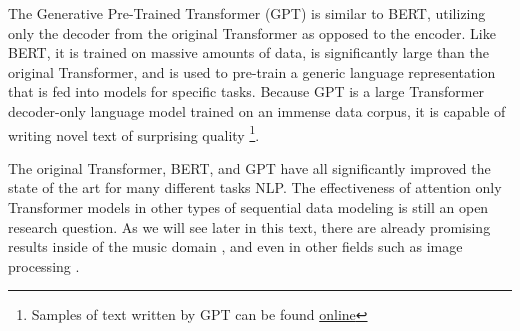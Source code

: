 The Generative Pre-Trained Transformer (GPT) is similar to BERT, utilizing only the decoder from the original Transformer as opposed to the encoder. Like BERT, it is trained on massive amounts of data, is significantly large than the original Transformer, and is used to pre-train a generic language representation that is fed into models for specific tasks. Because GPT is a large Transformer decoder-only language model trained on an immense data corpus, it is capable of writing novel text of surprising quality \footnote{Samples of text written by GPT can be found \href{https://openai.com/blog/better-language-models/}{online}}. 


The original Transformer, BERT, and GPT have all significantly improved the state of the art for many different tasks NLP. The effectiveness of attention only Transformer models in other types of sequential data modeling is still an open research question. As we will see later in this text, there are already promising results inside of the music domain , and even in other fields such as image processing \cite{dosovitskiy2020image}. 


 